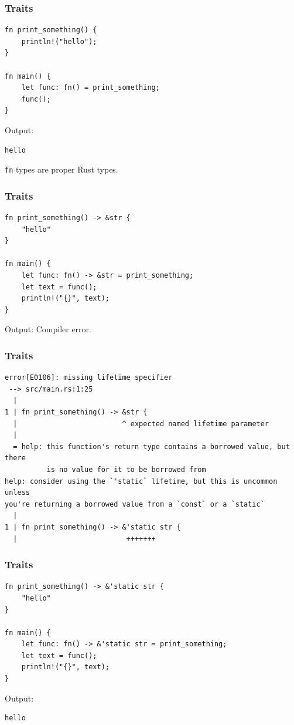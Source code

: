 \begin{frame}[fragile]
    \frametitle{Traits}
    \begin{verbatim}
fn print_something() {
    println!("hello");
}

fn main() {
    let func: fn() = print_something;
    func();
}
    \end{verbatim}
    \vfill
    Output:
    \pause
    \begin{verbatim}
hello
    \end{verbatim}
    \pause
    \vfill
    \texttt{fn} types are proper Rust types.
\end{frame}

\begin{frame}[fragile]
    \frametitle{Traits}
    \begin{verbatim}
fn print_something() -> &str {
    "hello"
}

fn main() {
    let func: fn() -> &str = print_something;
    let text = func();
    println!("{}", text);
}
    \end{verbatim}
    \vfill
    Output:
    \pause
    Compiler error.
\end{frame}

\begin{frame}[fragile]
    \frametitle{Traits}
    \begin{verbatim}
error[E0106]: missing lifetime specifier
 --> src/main.rs:1:25
  |
1 | fn print_something() -> &str {
  |                         ^ expected named lifetime parameter
  |
  = help: this function's return type contains a borrowed value, but there
          is no value for it to be borrowed from
help: consider using the `'static` lifetime, but this is uncommon unless
you're returning a borrowed value from a `const` or a `static`
  |
1 | fn print_something() -> &'static str {
  |                          +++++++
    \end{verbatim}
\end{frame}

\begin{frame}[fragile]
    \frametitle{Traits}
    \begin{verbatim}
fn print_something() -> &'static str {
    "hello"
}

fn main() {
    let func: fn() -> &'static str = print_something;
    let text = func();
    println!("{}", text);
}
    \end{verbatim}
    \vfill
    Output:
    \pause
    \begin{verbatim}
hello
    \end{verbatim}
\end{frame}

